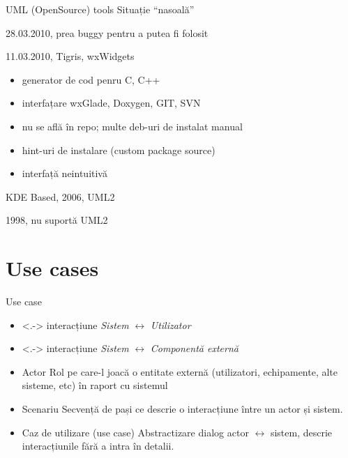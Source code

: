 \documentclass{beamer}
\begin{document}
\begin{frame}{UML (OpenSource) tools}
  Situație ``nasoală''
  \begin{description}[<+->]
    \item[BoUML] 28.03.2010, prea buggy pentru a putea fi folosit
    \item[Astade] 11.03.2010, Tigris, wxWidgets
      \begin{itemize}
	\item generator de cod penru C, C++
	\item interfațare wxGlade, Doxygen, GIT, SVN
	\item nu se află în repo; multe deb-uri de instalat manual
	\item hint-uri de instalare (custom package source)
	\item interfață neintuitivă
      \end{itemize}
    \item[Umbrello] KDE Based, 2006, UML2
    \item[ArgoUML] 1998, nu suportă UML2
  \end{description}
\end{frame}

\section{Use cases}
\begin{frame}{Use case}
  \begin{itemize}[<+->]
    \item<.-> interacțiune \textit{Sistem} $\leftrightarrow$ \textit{Utilizator}
    \item<.-> interacțiune \textit{Sistem} $\leftrightarrow$ \textit{Componentă
    externă}
    \item \begin{exampleblock}{Actor}
      Rol pe care-l joacă o entitate externă (utilizatori,
      echipamente, alte sisteme, etc) în raport cu sistemul
    \end{exampleblock}
    \item \begin{exampleblock}{Scenariu}
      Secvență de pași ce descrie o interacțiune între un actor și sistem.
    \end{exampleblock}
    \item \begin{exampleblock}{Caz de utilizare (use case)}
      Abstractizare dialog actor $\leftrightarrow$ sistem, descrie
      interacțiunile fără a intra în detalii.
    \end{exampleblock}
  \end{itemize}
\end{frame}
\end{document}
